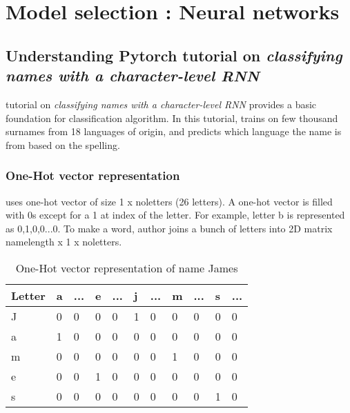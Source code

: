 \chapter{Model selection : Neural networks} \label{sec:feature-extraction}

\section{Understanding Pytorch tutorial on \textit{classifying names with a character-level \acs{RNN}} } \label{sec:chRNN}

\parencite{sean} tutorial on \textit{classifying names with a character-level \acs{RNN}} provides a basic foundation for classification algorithm. In this tutorial,  trains on few thousand surnames from 18 languages of origin, and predicts which language the name is from based on the spelling.
\subsection{One-Hot vector representation}
 uses one-hot vector of size 1 x no\textunderscore letters (26 letters). A one-hot vector is filled with 0s except for a 1 at index of the letter. For example, letter b is represented as 0,1,0,0...0. To make a word, author joins a bunch of letters into 2D matrix name\textunderscore length x 1 x no\textunderscore letters.

\begin{table}[h]
    \centering
    \caption{One-Hot vector representation of name James}
    \label{table:feature_imputation}
    \begin{tabular}{ lllllllllll }
          \toprule
          
          \textbf{Letter}& \textbf{a} & \textbf{...}& \textbf{e}&\textbf{...}&\textbf{j}&\textbf{...}&\textbf{m}&\textbf{...}&\textbf{s}&\textbf{...}\\
          \midrule
          J&0 & 0& 0& 0&1& 0& 0& 0& 0& 0\\
          a&1 & 0& 0& 0&0& 0& 0& 0& 0& 0\\         
          m&0 & 0& 0& 0&0& 0& 1& 0& 0& 0\\
          e&0 & 0& 1& 0&0& 0& 0& 0& 0& 0\\
          s&0 & 0& 0& 0&0& 0& 0& 0& 1& 0\\           
        
          \bottomrule
          \end{tabular}
\end{table}

